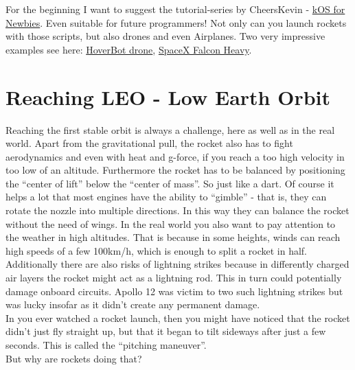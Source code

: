 \documentclass[12pt,paper=A4,numbers=noenddot,bibliography=totoc,listof=totoc,DIV=11,BCOR=1mm]{scrreprt}
\begin{document}
For the beginning I want to suggest the tutorial-series by CheersKevin - \href{https://www.youtube.com/playlist?list=PLb6UbFXBdbCoCm1e65qfDOCdK_qIBtX3D}{kOS for Newbies}.
Even suitable for future programmers! Not only can you launch rockets with those scripts, but also drones and even Airplanes.
Two very impressive examples see here: \href{https://youtu.be/f4SytD3xR0k}{HoverBot drone}, \href{https://youtu.be/oAzGwSFi9Qg}{SpaceX Falcon Heavy}.\\


\section{Reaching LEO - Low Earth Orbit}
Reaching the first stable orbit is always a challenge, here as well as in the real world. Apart from the gravitational pull, the rocket also has to fight aerodynamics and even with heat and
g-force, if you reach a too high velocity in too low of an altitude. Furthermore the rocket has to be balanced by positioning the ``center of lift'' below the ``center of mass''. So just like a dart. Of course it helps a lot that most engines have the ability to ``gimble'' - that is, they can rotate the nozzle into multiple directions.
In this way they can balance the rocket without the need of wings. In the real world you also want to pay attention to the weather in high altitudes. That is because in some heights, winds can reach high speeds of a few 100km/h, which is enough to split a rocket in half. Additionally there are also risks of lightning strikes because in differently charged air layers the rocket might act as a lightning rod. This in turn could potentially damage onboard circuits. Apollo 12 was victim to two such lightning strikes but was lucky insofar as it didn't create any permanent damage.\\

In you ever watched a rocket launch, then you might have noticed that the rocket didn't just fly straight up, but that it began to tilt sideways after just a few seconds. This is called the ``pitching maneuver''.\\
But why are rockets doing that?\\
\end{document}
